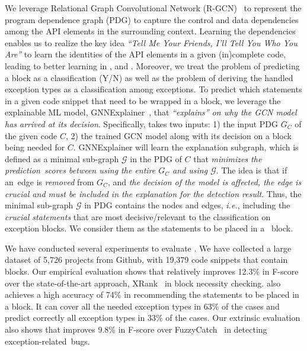 We leverage Relational Graph Convolutional Network (R-GCN)~\cite{rgcn}
to represent the program dependence graph (PDG) to capture the control
and data dependencies among the API elements in the surrounding
context. Learning the dependencies enables us to realize the
key idea {\em ``Tell Me Your Friends, I'll Tell You Who You Are''} to
learn the identities of the API elements in a given (in)complete code,
leading to better learning in {\xblock}, {\xstate} and
{\xtype}. Moreover, we treat the problem of predicting a
 block as a classification (Y/N) as well as the
problem of deriving the handled exception types as a classification
among exceptions.
%
To predict which statements in a given code snippet that need to be
wrapped in a  block, we leverage the explainable ML
model, GNNExplainer~\cite{GNNExplainer}, that {\em ``explains'' on why
  the GCN model has arrived at its decision}. Specifically, {\tool}
takes two inputs: 1) the input PDG $G_C$ of the given code $C$,
2) the trained GCN model along with its decision on a
 block being needed for $C$.
%
GNNExplainer will learn the explanation subgraph, which is
defined as a minimal sub-graph $\mathcal{G}$ in the PDG of $C$ that
{\em minimizes the prediction~scores between using the entire $G_C$
  and using $\mathcal{G}$}. The idea is that if an~edge is {\em
  removed} from $G_C$, and {\em the decision of the model is affected,
  the edge is crucial and must be included in the explanation for
  the detection result}. Thus, the minimal sub-graph $\mathcal{G}$ in
PDG contains the nodes and edges, {\em i.e.},  including the {\em
  crucial statements} that are most decisive/relevant to the
classification on exception blocks. We consider them as the statements
to be placed in a ~block.

We have conducted several experiments to evaluate {\tool}. We have
collected a large dataset of 5,726 projects from Github, with 19,379
code snippets that contain  blocks.
%
Our empirical evaluation shows that {\tool} relatively
improves 12.3\% in F-score over the state-of-the-art approach,
XRank~\cite{xrank-fse20} in  block necessity checking.
{\tool} also achieves a high accuracy of 74\% in recommending the
statements to be placed in a  block. It can cover all
the needed exception types in 63\% of the cases and predict correctly
all exception types in 33\% of the cases. Our extrinsic evaluation
also shows that {\tool} improves 9.8\% in F-score over
FuzzyCatch~\cite{xrank-fse20} in detecting exception-related~bugs.

